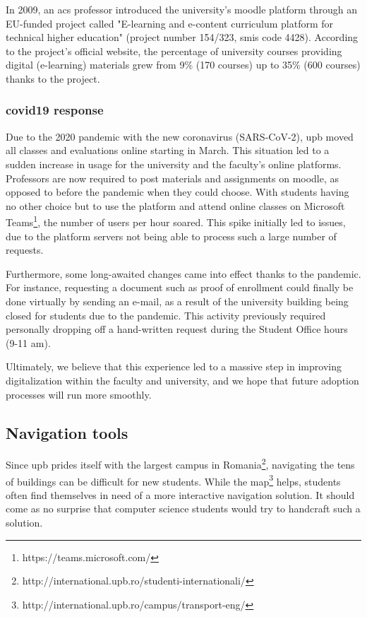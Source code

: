     In 2009, an \acrshort{acs} professor introduced the university's \gls{moodle} platform through an EU-funded project called "E-learning and e-content curriculum platform for technical higher education" (project number 154/323, \gls{smis} code 4428). According to the project's official website\cite{upb2009elearning}, the percentage of university courses providing digital (e-learning) materials grew from 9\% (170 courses) up to 35\% (600 courses) thanks to the project.
    
    \subsubsection{\gls{covid19} response} \label{2:existing_apps_history_covid}
    Due to the 2020 pandemic with the new coronavirus (SARS-CoV-2), \acrshort{upb} moved all classes and evaluations online starting in March. This situation led to a sudden increase in usage for the university and the faculty's online platforms. Professors are now required to post materials and assignments on \gls{moodle}, as opposed to before the pandemic when they could choose. With students having no other choice but to use the platform and attend online classes on Microsoft Teams\footnote{https://teams.microsoft.com/}, the number of users per hour soared. This spike initially led to issues, due to the platform servers not being able to process such a large number of requests.
    
    Furthermore, some long-awaited changes came into effect thanks to the pandemic. For instance, requesting a document such as proof of enrollment could finally be done virtually by sending an e-mail, as a result of the university building being closed for students due to the pandemic. This activity previously required personally dropping off a hand-written request during the Student Office hours (9-11 am).
    
    Ultimately, we believe that this experience led to a massive step in improving digitalization within the faculty and university, and we hope that future adoption processes will run more smoothly.
    
    \subsection{Navigation tools} \label{2:existing_apps_navigation}
    Since \acrshort{upb} prides itself with the largest campus in Romania\footnote{http://international.upb.ro/studenti-internationali/}, navigating the tens of buildings can be difficult for new students. While the map\footnote{http://international.upb.ro/campus/transport-eng/} helps, students often find themselves in need of a more interactive navigation solution. It should come as no surprise that computer science students would try to handcraft such a solution.
    
